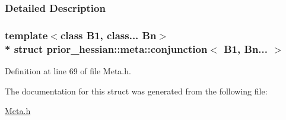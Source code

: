 \subsubsection{Detailed Description}
\subsubsection*{template$<$class B1, class... Bn$>$\\*
struct prior\+\_\+hessian\+::meta\+::conjunction$<$ B1, Bn... $>$}



Definition at line 69 of file Meta.\+h.



The documentation for this struct was generated from the following file\+:\begin{DoxyCompactItemize}
\item 
\hyperlink{Meta_8h}{Meta.\+h}\end{DoxyCompactItemize}
